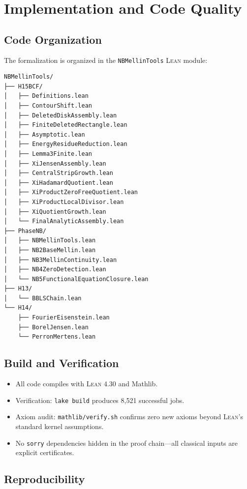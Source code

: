 \documentclass[11pt,a4paper]{article}
\newcommand{\Lean}{\textsc{Lean}\xspace}
\newcommand{\CodeName}[1]{\texttt{#1}}
\begin{document}
\section{Implementation and Code Quality}
\label{sec:code}

\subsection{Code Organization}

The formalization is organized in the \CodeName{NBMellinTools} \Lean module:

\begin{verbatim}
NBMellinTools/
├── H15BCF/
│   ├── Definitions.lean
│   ├── ContourShift.lean
│   ├── DeletedDiskAssembly.lean
│   ├── FiniteDeletedRectangle.lean
│   ├── Asymptotic.lean
│   ├── EnergyResidueReduction.lean
│   ├── Lemma3Finite.lean
│   ├── XiJensenAssembly.lean
│   ├── CentralStripGrowth.lean
│   ├── XiHadamardQuotient.lean
│   ├── XiProductZeroFreeQuotient.lean
│   ├── XiProductLocalDivisor.lean
│   ├── XiQuotientGrowth.lean
│   └── FinalAnalyticAssembly.lean
├── PhaseNB/
│   ├── NBMellinTools.lean
│   ├── NB2BaseMellin.lean
│   ├── NB3MellinContinuity.lean
│   ├── NB4ZeroDetection.lean
│   └── NB5FunctionalEquationClosure.lean
├── H13/
│   └── BBLSChain.lean
└── H14/
    ├── FourierEisenstein.lean
    ├── BorelJensen.lean
    └── PerronMertens.lean
\end{verbatim}

\subsection{Build and Verification}

\begin{itemize}
  \item All code compiles with \Lean 4.30 and Mathlib.
  \item Verification: \texttt{lake build} produces 8,521 successful jobs.
  \item Axiom audit: \texttt{mathlib/verify.sh} confirms zero new axioms beyond \Lean's standard kernel assumptions.
  \item No \texttt{sorry} dependencies hidden in the proof chain—all classical inputs are explicit certificates.
\end{itemize}

\subsection{Reproducibility}
\end{document}
